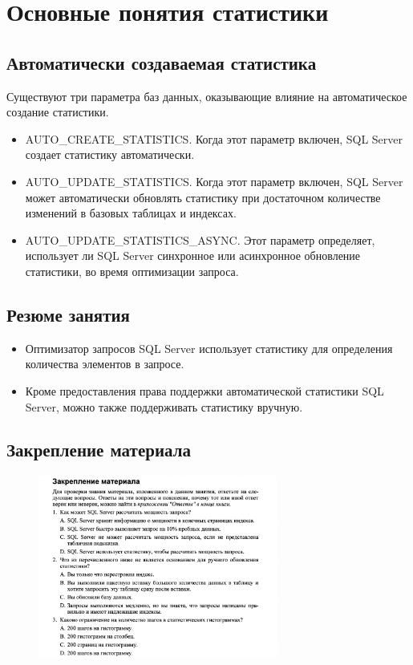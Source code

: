 \section{Основные понятия статистики}


\subsection{Автоматически создаваемая статистика}

Существуют три параметра баз данных, оказывающие
влияние на автоматическое создание статистики. 

\begin{itemize}
	\item AUTO\_CREATE\_STATISTICS. Когда этот параметр включен, SQL Server создает статистику автоматически.
	\item AUTO\_UPDATE\_STATISTICS. Когда этот параметр включен, SQL Server может автоматически обновлять статистику при достаточном количестве изменений в базовых таблицах и индексах.
	\item AUTO\_UPDATE\_STATISTICS\_ASYNC. Этот параметр определяет, использует ли SQL Server синхронное или асинхронное обновление статистики, во время оптимизации запроса.
\end{itemize}



\subsection*{Резюме занятия}
\begin{itemize}
	\item Оптимизатор запросов SQL Server использует статистику для определения количества элементов в запросе.
	\item Кроме предоставления права поддержки автоматической статистики SQL Server,
	можно также поддерживать статистику вручную. 
\end{itemize}


\subsection*{Закрепление материала}

\begin{figure}[h!]
	\begin{center}
		\includegraphics[width=0.7\textwidth]{img/zakrep45.png}
	\end{center}
	\captionsetup{justification=centering}
\end{figure}
\clearpage

